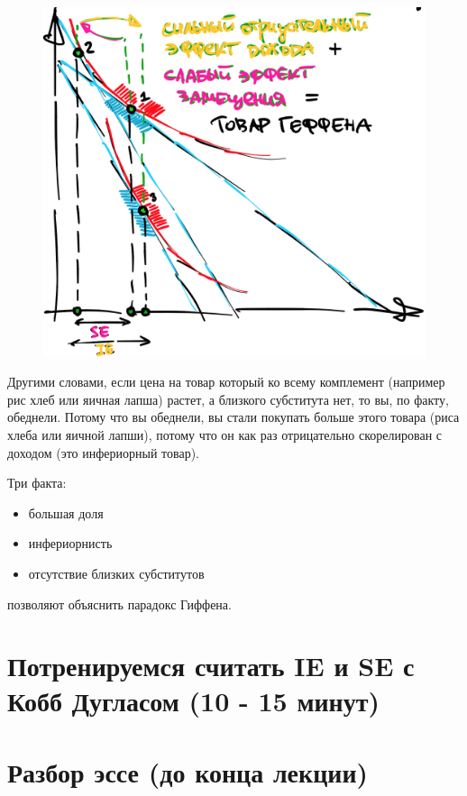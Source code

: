 \documentclass{beamer}
\begin{document}
\begin{frame}
\begin{figure}[hbt]
\centering
\includegraphics[width=.8 \textwidth]{IESE_CV.png}
\end{figure}

\end{frame}

\begin{frame}

Другими словами, если цена на товар который ко всему комплемент (например рис  хлеб или яичная лапша) растет, а близкого субститута нет, то вы, по факту, обеднели. Потому что вы обеднели, вы стали покупать больше этого товара (риса хлеба или яичной лапши), потому что он как раз отрицательно скорелирован с доходом (это инфериорный товар).

\alert{Три факта}:
\begin{itemize}
  \item большая доля
  \item инфериорнисть
  \item отсутствие близких субститутов
\end{itemize}

\alert{позволяют объяснить парадокс Гиффена}.

\end{frame}

\section{Потренируемся считать IE и SE с Кобб Дугласом (10 - 15 минут)}

\section{Разбор эссе (до конца лекции)}
\end{document}
